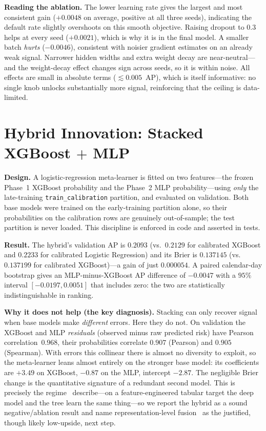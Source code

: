 \documentclass[conference]{IEEEtran}
\newcommand{\code}[1]{\texttt{#1}}
\begin{document}
\textbf{Reading the ablation.}
The lower learning rate gives the largest and most consistent gain ($+0.0048$ on
average, positive at all three seeds), indicating the default rate slightly
overshoots on this smooth objective. Raising dropout to $0.3$ helps at every seed
($+0.0021$), which is why it is in the final model. A smaller batch \emph{hurts}
($-0.0046$), consistent with noisier gradient estimates on an already weak
signal. Narrower hidden widths and extra weight decay are near-neutral---and the
weight-decay effect changes sign across seeds, so it is within noise. All effects
are small in absolute terms ($\lesssim 0.005$~AP), which is itself informative:
no single knob unlocks substantially more signal, reinforcing that the ceiling is
data-limited.

\section{Hybrid Innovation: Stacked XGBoost $+$ MLP}
\label{sec:hybrid}
\textbf{Design.}
A logistic-regression meta-learner is fitted on two features---the frozen Phase~1
XGBoost probability and the Phase~2 MLP probability---using \emph{only} the
late-training \code{train\_calibration} partition, and evaluated on validation.
Both base models were trained on the early-training partition alone, so their
probabilities on the calibration rows are genuinely out-of-sample; the test
partition is never loaded. This discipline is enforced in code and asserted in
tests.

\textbf{Result.}
The hybrid's validation AP is $0.2093$ (vs.\ $0.2129$ for calibrated XGBoost and
$0.2233$ for calibrated Logistic Regression) and its Brier is $0.137145$ (vs.\
$0.137199$ for calibrated XGBoost)---a gain of just $0.000054$. A paired
calendar-day bootstrap gives an MLP-minus-XGBoost AP difference of $-0.0047$ with
a $95\%$ interval $[-0.0197, 0.0051]$ that includes zero: the two are
statistically indistinguishable in ranking.

\textbf{Why it does not help (the key diagnosis).}
Stacking can only recover signal when base models make \emph{different} errors.
Here they do not. On validation the XGBoost and MLP \emph{residuals} (observed
minus raw predicted risk) have Pearson correlation~$0.968$, their probabilities
correlate $0.907$ (Pearson) and $0.905$ (Spearman). With errors this collinear
there is almost no diversity to exploit, so the meta-learner leans almost
entirely on the stronger base model: its coefficients are $+3.49$ on XGBoost,
$-0.87$ on the MLP, intercept $-2.87$. The negligible Brier change is the
quantitative signature of a redundant second model. This is precisely the
regime~\cite{grinsztajn,shwartzziv} describe---on a feature-engineered tabular
target the deep model and the tree learn the same thing---so we report the hybrid
as a sound negative/ablation result and name representation-level
fusion~\cite{entityembed,fbgbdt} as the justified, though likely low-upside, next
step.
\end{document}
